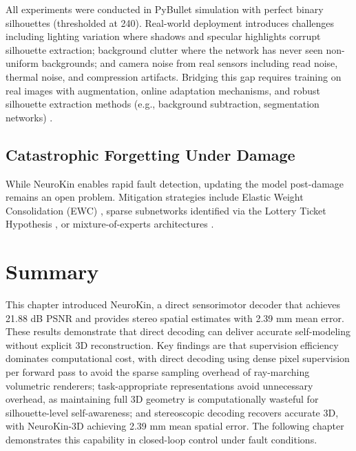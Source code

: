 \documentclass[12pt,a4paper,oneside]{report}
\begin{document}
All experiments were conducted in PyBullet simulation with perfect binary silhouettes (thresholded at 240). Real-world deployment introduces challenges including lighting variation where shadows and specular highlights corrupt silhouette extraction; background clutter where the network has never seen non-uniform backgrounds; and camera noise from real sensors including read noise, thermal noise, and compression artifacts. Bridging this gap requires training on real images with augmentation, online adaptation mechanisms, and robust silhouette extraction methods (e.g., background subtraction, segmentation networks) \cite{rezvani2024robust, qiu2024swim2real, lim2025splat2real}.

\subsection{Catastrophic Forgetting Under Damage}

While NeuroKin enables rapid fault detection, updating the model post-damage remains an open problem. Mitigation strategies include Elastic Weight Consolidation (EWC) \cite{kirkpatrick2017overcoming}, sparse subnetworks identified via the Lottery Ticket Hypothesis \cite{frankle2018lottery}, or mixture-of-experts architectures \cite{mocanu2018scalable}.

\section{Summary}

This chapter introduced NeuroKin, a direct sensorimotor decoder that achieves 21.88 dB PSNR and provides stereo spatial estimates with 2.39 mm mean error. These results demonstrate that direct decoding can deliver accurate self-modeling without explicit 3D reconstruction. Key findings are that supervision efficiency dominates computational cost, with direct decoding using dense pixel supervision per forward pass to avoid the sparse sampling overhead of ray-marching volumetric renderers; task-appropriate representations avoid unnecessary overhead, as maintaining full 3D geometry is computationally wasteful for silhouette-level self-awareness; and stereoscopic decoding recovers accurate 3D, with NeuroKin-3D achieving 2.39 mm mean spatial error. The following chapter demonstrates this capability in closed-loop control under fault conditions.

\clearpage

\end{document}
